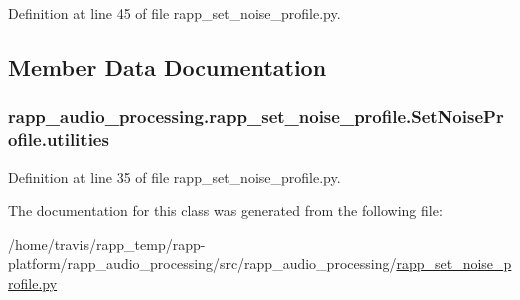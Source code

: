 Definition at line 45 of file rapp\-\_\-set\-\_\-noise\-\_\-profile.\-py.



\subsection{Member Data Documentation}
\hypertarget{classrapp__audio__processing_1_1rapp__set__noise__profile_1_1SetNoiseProfile_a92b867917dda2074b371fe9bb225df73}{
\subsubsection[{utilities}]{\setlength{\rightskip}{0pt plus 5cm}rapp\-\_\-audio\-\_\-processing.\-rapp\-\_\-set\-\_\-noise\-\_\-profile.\-Set\-Noise\-Profile.\-utilities}}\label{classrapp__audio__processing_1_1rapp__set__noise__profile_1_1SetNoiseProfile_a92b867917dda2074b371fe9bb225df73}


Definition at line 35 of file rapp\-\_\-set\-\_\-noise\-\_\-profile.\-py.



The documentation for this class was generated from the following file\-:\begin{DoxyCompactItemize}
\item 
/home/travis/rapp\-\_\-temp/rapp-\/platform/rapp\-\_\-audio\-\_\-processing/src/rapp\-\_\-audio\-\_\-processing/\hyperlink{rapp__set__noise__profile_8py}{rapp\-\_\-set\-\_\-noise\-\_\-profile.\-py}\end{DoxyCompactItemize}

